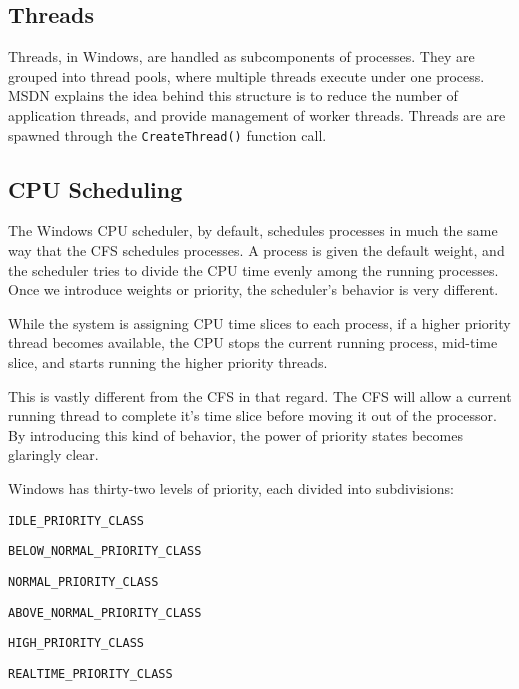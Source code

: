   \subsection{Threads}
Threads, in Windows, are handled as subcomponents of processes. They are grouped
into thread pools, where multiple threads execute under one process. MSDN explains
the idea behind this structure is to reduce the number of application threads, and
provide management of worker threads. Threads are are spawned through the
\texttt{CreateThread()} function call.\cite{msthreadcreate2016}

%

  \subsection{CPU Scheduling}
  The Windows CPU scheduler, by default, schedules processes in much the same way
  that the CFS schedules processes. A process is given the default weight, and
  the scheduler tries to divide the CPU time evenly among the running processes.
  Once we introduce weights or priority, the scheduler's behavior is very different.

  While the system is assigning CPU time slices to each process, if a higher priority
  thread becomes available, the CPU stops the current running process, mid-time
  slice, and starts running the higher priority threads.

  This is vastly different from the CFS in that regard. The CFS will allow a current
  running thread to complete it's time slice before moving it out of the processor.
  By introducing this kind of behavior, the power of priority states becomes glaringly
  clear.

  Windows has thirty-two levels of priority, each divided into subdivisions:
  \begin{description}
    \item \texttt{IDLE\_PRIORITY\_CLASS}
    \item \texttt{BELOW\_NORMAL\_PRIORITY\_CLASS}
    \item \texttt{NORMAL\_PRIORITY\_CLASS}
    \item \texttt{ABOVE\_NORMAL\_PRIORITY\_CLASS}
    \item \texttt{HIGH\_PRIORITY\_CLASS}
    \item \texttt{REALTIME\_PRIORITY\_CLASS}
  \end{description}

